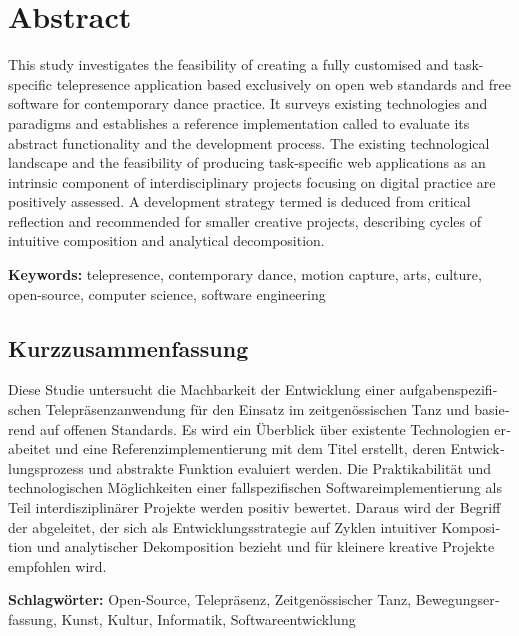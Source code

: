 \section*{Abstract}

This study investigates the feasibility of creating a fully customised and task-specific telepresence application based exclusively on open web standards and free software for contemporary dance practice.
It surveys existing technologies and paradigms and establishes a reference implementation called  to evaluate its abstract functionality and the development process.
The existing technological landscape and the feasibility of producing task-specific web applications as an intrinsic component of interdisciplinary projects focusing on digital practice are positively assessed.
A development strategy termed  is deduced from critical reflection and recommended for smaller creative projects, describing cycles of intuitive composition and analytical decomposition.

\textbf{Keywords:} telepresence, contemporary dance, motion capture, arts, culture, open-source, computer science, software engineering


\begin{otherlanguage}{ngerman}
\section*{Kurzzusammenfassung}
Diese Studie untersucht die Machbarkeit der Entwicklung einer aufgabenspezifischen Telepräsenzanwendung für den Einsatz im zeitgenössischen Tanz und basierend auf offenen Standards.
Es wird ein Überblick über existente Technologien erabeitet und eine Referenzimplementierung mit dem Titel  erstellt, deren Entwicklungsprozess und abstrakte Funktion evaluiert werden.
Die Praktikabilität und technologischen Möglichkeiten einer fallspezifischen Softwareimplementierung als Teil interdisziplinärer Projekte werden positiv bewertet.
Daraus wird der Begriff der  abgeleitet, der sich als Entwicklungsstrategie auf Zyklen intuitiver Komposition und analytischer Dekomposition bezieht und für kleinere kreative Projekte empfohlen wird.
 
\textbf{Schlagwörter:} Open-Source, Telepräsenz, Zeitgenössischer Tanz, Bewegungserfassung, Kunst, Kultur, Informatik, Softwareentwicklung
\end{otherlanguage}